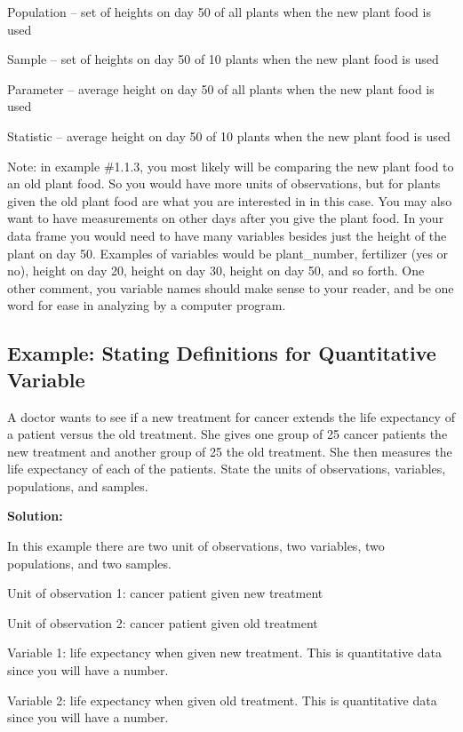 \documentclass[
]{book}
\begin{document}
Population -- set of heights on day 50 of all plants when the new plant food is used

Sample -- set of heights on day 50 of 10 plants when the new plant food is used

Parameter -- average height on day 50 of all plants when the new plant food is used

Statistic -- average height on day 50 of 10 plants when the new plant food is used

Note: in example \#1.1.3, you most likely will be comparing the new plant food to an old plant food. So you would have more units of observations, but for plants given the old plant food are what you are interested in in this case. You may also want to have measurements on other days after you give the plant food. In your data frame you would need to have many variables besides just the height of the plant on day 50. Examples of variables would be plant\_number, fertilizer (yes or no), height on day 20, height on day 30, height on day 50, and so forth. One other comment, you variable names should make sense to your reader, and be one word for ease in analyzing by a computer program.

\hypertarget{example-stating-definitions-for-quantitative-variable-1}{%
\subsection{Example: Stating Definitions for Quantitative Variable}\label{example-stating-definitions-for-quantitative-variable-1}}

A doctor wants to see if a new treatment for cancer extends the life expectancy of a patient versus the old treatment. She gives one group of 25 cancer patients the new treatment and another group of 25 the old treatment. She then measures the life expectancy of each of the patients. State the units of observations, variables, populations, and samples.

\textbf{Solution:}

In this example there are two unit of observations, two variables, two populations, and two samples.

Unit of observation 1: cancer patient given new treatment

Unit of observation 2: cancer patient given old treatment

Variable 1: life expectancy when given new treatment. This is quantitative data since you will have a number.

Variable 2: life expectancy when given old treatment. This is quantitative data since you will have a number.
\end{document}
